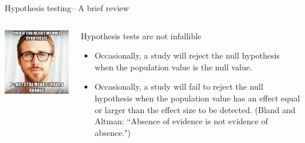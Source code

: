 \documentclass[ignorenonframetext,]{beamer}
\begin{document}
\begin{frame}{Hypothesis testing-- A brief review}

\begin{columns}
\begin{column}{0.5\textwidth}

\begin{center}\includegraphics[width=\textwidth]{images/reject_null} \end{center}
\end{column}

\begin{column}{0.5\textwidth}
\begin{block}{Hypothesis tests are not infallible}
\begin{itemize}
  \item Occasionally, a study will reject the null hypothesis when the population value is the null value. 
  \item Occasionally, a study will fail to reject the null hypothesis when the population value has an effect equal or larger than the effect size to be detected. (Bland and Altman: ``Absence of evidence is not evidence of absence.")
\end{itemize}
\end{block}
\end{column}
\end{columns}

\end{frame}
\end{document}
